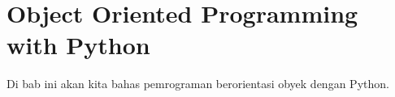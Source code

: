 
\chapter{Object Oriented Programming with Python}

Di bab ini akan kita bahas pemrograman berorientasi obyek dengan Python.


